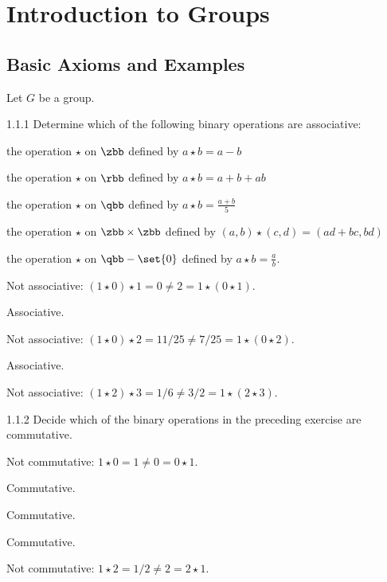 \section{Introduction to Groups}

\subsection{Basic Axioms and Examples}

Let $G$ be a group.

\begin{exercise}{1.1.1}
    Determine which of the following binary operations are associative:
    \begin{subexercises}
        \item the operation $\star$ on $\zbb$ defined by $a \star b = a - b$
        \item the operation $\star$ on $\rbb$ defined by $a \star b = a + b + ab$
        \item the operation $\star$ on $\qbb$ defined by $a \star b = \frac{a + b}{5}$
        \item the operation $\star$ on $\zbb \times \zbb$ defined by $(a,b) \star (c,d) = (ad + bc, bd)$
        \item the operation $\star$ on $\qbb - \set{0}$ defined by $a \star b = \frac{a}{b}$.
    \end{subexercises}
\end{exercise}

\begin{solenum}
    \item Not associative: $(1 \star 0) \star 1 = 0 \neq 2 = 1 \star (0 \star 1)$.
    \item Associative.
    \item Not associative: $(1 \star 0) \star 2 = 11/25 \neq 7/25 = 1 \star (0 \star 2)$.
    \item Associative.
    \item Not associative: $(1 \star 2) \star 3 = 1/6 \neq 3/2 = 1 \star (2 \star 3)$.
\end{solenum}

\begin{exercise}{1.1.2}
    Decide which of the binary operations in the preceding exercise are commutative.
\end{exercise}

\begin{solenum}
    \item Not commutative: $1 \star 0 = 1 \neq 0 = 0 \star 1$.
    \item Commutative.
    \item Commutative.
    \item Commutative.
    \item Not commutative: $1 \star 2 = 1/2 \neq 2 = 2 \star 1$.
\end{solenum}

